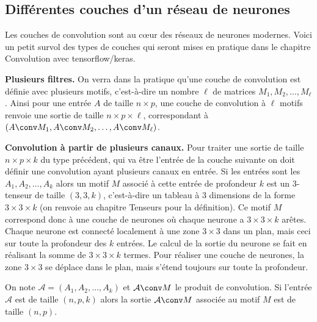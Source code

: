 \documentclass[11pt,class=report,crop=false]{standalone}
\begin{document}
\subsection{Différentes couches d'un réseau de neurones}

Les couches de convolution sont au c\oe ur des réseaux de neurones modernes. Voici un petit survol des types de couches qui seront mises en pratique dans le chapitre \og{}Convolution avec tensorflow/keras\fg{}.

\textbf{Plusieurs filtres.}
On verra dans la pratique qu'une couche de convolution est définie avec plusieurs motifs, c'est-à-dire un nombre $\ell$ de matrices $M_1, M_2,\ldots, M_\ell$.
Ainsi pour une entrée $A$ de taille $n \times p$, une couche de convolution à $\ell$ motifs renvoie une sortie de taille $n \times p \times \ell$, correspondant à 
$(A \conv M_1, A \conv M_2, \ldots, A \conv M_\ell)$.

   
\bigskip

\textbf{Convolution à partir de plusieurs canaux.}
Pour traiter une sortie de taille  $n \times p \times k$ du type précédent, qui va être l'entrée de la couche suivante on doit définir une convolution ayant plusieurs canaux en entrée. Si les entrées sont les $A_1, A_2,\ldots, A_k$ 
alors un motif $M$ associé à cette entrée de profondeur $k$ est
un $3$-tenseur de taille $(3, 3, k)$, c'est-à-dire un tableau à $3$ dimensions de la forme $3 \times 3 \times k$ (on renvoie au chapitre \og{}Tenseurs\fg{} pour la définition).
Ce motif $M$ correspond donc à une couche de neurones où chaque neurone a $3\times3\times k$ arêtes. Chaque neurone est connecté localement à une zone $3\times 3$ dans un plan, mais ceci sur toute la profondeur des $k$ entrées. Le calcul de la sortie du neurone se fait en réalisant la somme de $3 \times 3 \times k$ termes. Pour réaliser une couche de neurones, la zone $3 \times 3$ se déplace dans le plan, mais s'étend toujours sur toute la profondeur.


On note $\mathcal{A} = (A_1, A_2,\ldots, A_k)$ et $\mathcal{A} \conv M$ le produit de convolution.
Si l'entrée $\mathcal{A}$ est de taille $(n,p,k)$ alors la sortie $\mathcal{A} \conv M$ associée au motif $M$ est de taille $(n,p)$.
\end{document}
